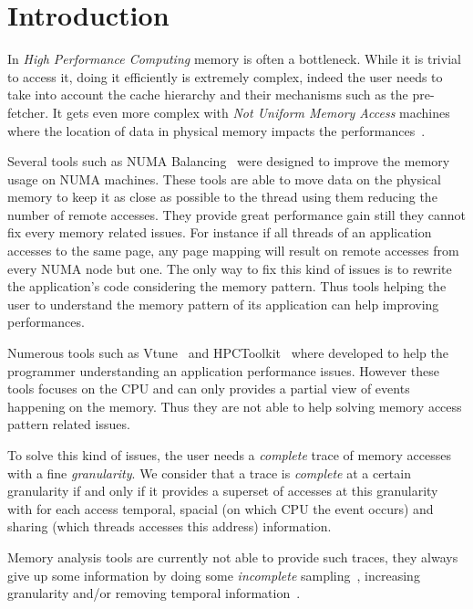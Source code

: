 \section{Introduction}
\label{sec:intro}

In \emph{High Performance Computing} memory is often a bottleneck.
While it is trivial to access it, doing it efficiently is extremely
complex, indeed the user needs to take into account the cache hierarchy and
their mechanisms such as the pre-fetcher. It gets even more complex with
\emph{Not Uniform Memory Access} machines where the location of data in
physical memory impacts the performances~\cite{Drepper07What}.

Several tools such as NUMA Balancing~\cite{Corbet2012} were designed to improve the
memory usage on NUMA machines. These tools are able to move data on the
physical memory to keep it as close as possible to the thread using them
reducing the number of remote accesses. They provide great performance gain
still they cannot fix every memory related issues. For instance if all
threads of an application accesses to the same page, any page mapping will
result on remote accesses from every NUMA node but one. The only way to fix
this kind of issues is to rewrite the application's code considering the
memory pattern. Thus tools helping the user to understand the memory pattern
of its application can help improving performances.

Numerous tools such as Vtune~\cite{Reinders05VTune} and
HPCToolkit~\cite{Adhianto10HPCTOOLKIT} where developed to help the programmer
understanding an application performance issues. However these tools
focuses on the CPU and can only provides a partial view of events happening on
the memory. Thus they are not able to help solving memory access pattern
related issues.

To solve this kind of issues, the user needs a \emph{complete} trace of memory
accesses with a fine \emph{granularity}. We consider that a trace is
\emph{complete} at a certain granularity if and only if it provides a superset
of accesses at this granularity with for each access temporal, spacial (on
which CPU the event occurs) and sharing (which threads accesses this address)
information.

Memory analysis tools are currently not able to provide such traces, they
always give up some information by doing some \emph{incomplete}
sampling~\cite{Liu14Tool,Lachaize12MemProf}, increasing granularity and/or
removing temporal information~\cite{Beniamine15TABARNACRR}.

